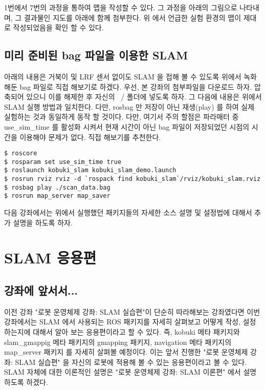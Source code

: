 1번에서 7번의 과정을 통하여 맵을 작성할 수 있다. 그 과정을 아래의 그림으로 나타내며, 그 결과물인 지도를 아래에 함께 첨부한다. 위 에서 언급한 실험 환경의 맵이 제대로 작성되었음을 확인 할 수 있다.

\subsection{미리 준비된 bag 파일을 이용한 SLAM}

아래의 내용은 거북이 및 LRF 센서 없이도 SLAM 을 접해 볼 수 있도록 위에서 녹화해둔 bag 파일로 직접 해보기로 하겠다. 우선, 본 강좌의 첨부파일을 다운로드 하자. 압축되어 있으니 이를 해제한 후 자신의 ~/ 폴더에 넣도록 하자. 그 다음에 내용은 위에서 SLAM 실행 방법과 일치한다. 다만, rosbag 만 저장이 아닌 재생(play) 를 하여 실제 실험하는 것과 동일하게 동작 할 것이다. 다만, 여기서 주의 할점은 파라매터 중 use\_sim\_time 를 활성화 시켜서 현재 시간이 아닌 bag 파일이 저장되었던 시점의 시간을 이용해야 문제가 없다. 직접 해보기를 추천한다.

\vspace{\baselineskip}
\begin{lstlisting}[language=ROS]
$ roscore
$ rosparam set use_sim_time true
$ roslaunch kobuki_slam kobuki_slam_demo.launch
$ rosrun rviz rviz -d `rospack find kobuki_slam`/rviz/kobuki_slam.rviz
$ rosbag play ./scan_data.bag
$ rosrun map_server map_saver
\end{lstlisting}

다음 강좌에서는 위에서 실행했던 패키지들의 자세한 소스 설명 및 설정법에 대해서 추가 설명을 하도록 하자.

\section{SLAM 응용편}

\subsection{강좌에 앞서서...}

이전 강좌 "로봇 운영체제 강좌: SLAM 실습편"이 단순히 따라해보는 강좌였다면 이번 강좌에서는 SLAM 에서 사용되는 ROS 패키지를 자세히 살펴보고 어떻게 작성, 설정하는지에 대해서 알아 보는 응용편이라고 할 수 있다. 즉, kobuki 메타 패키지와 slam\_gmappig 메타 패키지의 gmapping 패키지, navigation 메타 패키지의 map\_server 패키지 를 자세히 살펴볼 예정이다. 이는 앞서 진행한 "로봇 운영체제 강좌: SLAM 실습편" 을 자신의 로봇에 적용해 볼 수 있는 응용편이라고 볼 수 있다. SLAM 자체에 대한 이론적인 설명은 "로봇 운영체제 강좌: SLAM 이론편" 에서 설명하도록 하겠다.


